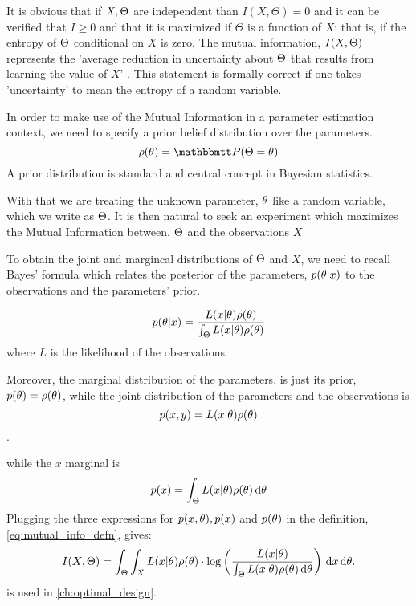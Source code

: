 It is obvious that if $X,{\Theta}$ are independent than $I(X,\Theta) = 0$ and it can
be verified that $I\geq0$ and that it is maximized if $\Theta$ is a function of
$X$; that is, if the entropy of ${\Theta}$ conditional on $X$ is zero. 
The mutual information, $I(X,{\Theta})$ represents the 'average
reduction in uncertainty about ${\Theta}$ that results from learning the value of
$X$' \cite{MacKay2003}. This statement is formally correct if one takes
 'uncertainty' to mean the entropy of a random
 variable.
 
In order to make use of the Mutual Information in a parameter estimation
context, we need to specify a prior belief distribution over the  parameters.  
$$
\rho(\th) = \Prob(\Theta = \th)
$$
A prior distribution is standard and central concept in Bayesian statistics.
 
With that we are treating the unknown parameter, ${ \theta}$ like a random variable,
which we write as ${\Theta}$. It is then natural to seek an experiment which
maximizes the Mutual Information between, ${\Theta}$ and the observations $X$

To obtain the joint and margincal distributions of ${\Theta}$ and $X$, we
need to recall Bayes' formula which relates the posterior of the parameters,
$p({ \theta}|x)$ to the observations and the parameters' prior. 

\begin{equation}
p({ \theta}|x) = \frac{L(x|{ \theta})\rho({ \theta})}{\int_{\Theta} L(x|{ \theta})\rho({ \theta})}
\label{eq:bayes_formula}
\end{equation}
where $L$ is the likelihood of the observations.

Moreover, the marginal distribution of the parameters, is just its prior,
$p({ \theta}) = \rho({ \theta})$, while the joint distribution of the parameters and the
observations is $$p(x,y) = L(x|{ \theta})\rho({ \theta})$$.

while the $x$ marginal is $$p(x) = \int_\Theta L(x|{ \theta})\rho({ \theta}) \, \mathrm{d} { \theta}$$
Plugging the three expressions for $p(x,{ \theta}), p(x)$ and $p({ \theta})$ in the
definition, \cref{eq:mutual_info_defn}, gives:
\begin{equation}
I(X,{\Theta}) = \int_\Theta \int_X L(x|{ \theta})\rho({ \theta}) \cdot 
\log \left( \frac{L(x|{ \theta}) }
				{\int_\Theta L(x|{ \theta})\rho({ \theta}) \, \mathrm{d} { \theta}  } \right)
\, \mathrm{d} x\, \mathrm{d} { \theta}.
\label{eq:mutual_info_posterior_vs_observations} 
\end{equation} 
  is used in
\cref{ch:optimal_design}.


